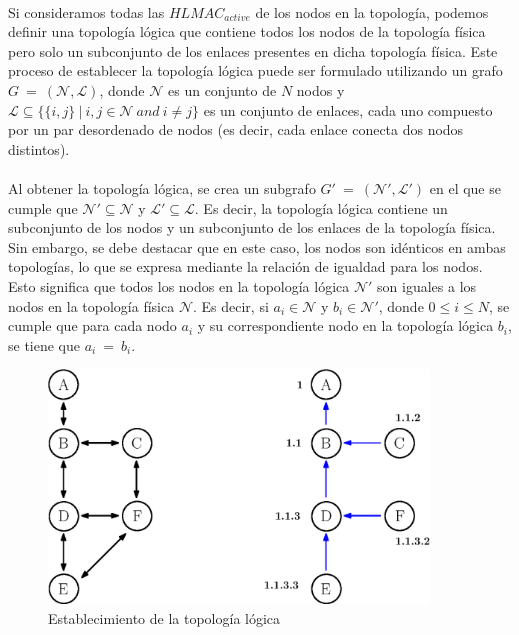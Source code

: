 \\
Si consideramos todas las $HLMAC_{active}$ de los nodos en la topología, podemos definir una topología lógica que contiene todos los nodos de la topología física pero solo un subconjunto de los enlaces presentes en dicha topología física. Este proceso de establecer la topología lógica puede ser formulado utilizando un grafo $G \: = \: (\mathcal{N}, \mathcal{L})$, donde $\mathcal{N}$ es un conjunto de $N$ nodos y $\mathcal{L} \subseteq \{\{i,j\} \: | \: i,j \in \mathcal{N} \: and \: i \neq j\}$ es un conjunto de enlaces, cada uno compuesto por un par desordenado de nodos (es decir, cada enlace conecta dos nodos distintos).\\
\\
Al obtener la topología lógica, se crea un subgrafo $G' \: = \: (\mathcal{N}', \mathcal{L}')$ en el que se cumple que $\mathcal{N}' \subseteq \mathcal{N}$ y $\mathcal{L}' \subseteq \mathcal{L}$. Es decir, la topología lógica contiene un subconjunto de los nodos y un subconjunto de los enlaces de la topología física. Sin embargo, se debe destacar que en este caso, los nodos son idénticos en ambas topologías, lo que se expresa mediante la relación de igualdad para los nodos. Esto significa que todos los nodos en la topología lógica $\mathcal{N}'$ son iguales a los nodos en la topología física $\mathcal{N}$. Es decir, si $a_{i} \in \mathcal{N}$ y $b_{i} \in \mathcal{N}'$, donde $0 \leq i \leq N$, se cumple que para cada nodo $a_{i}$ y su correspondiente nodo en la topología lógica $b_{i}$, se tiene que $a_{i} \: = \: b_{i}$.
\begin{figure}[ht]
    \centering
    \includegraphics[width=0.9\textwidth]{archivos/img/dev/topo_logic.eps}
    \caption{Establecimiento de la topología lógica}
    \label{fig:topo_logic}
\end{figure}

